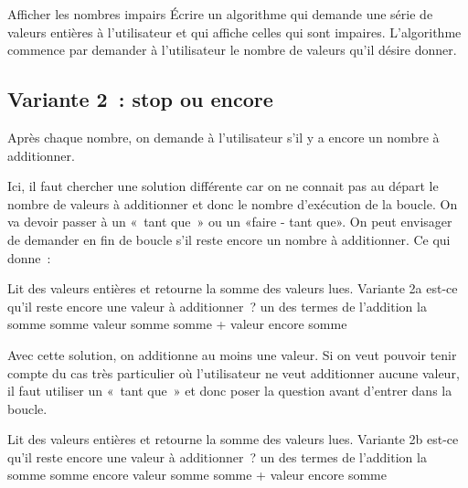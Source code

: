 		\begin{Exercice}{Afficher les nombres impairs}
			Écrire un algorithme qui demande une série
			de valeurs entières à l’utilisateur
			et qui affiche celles qui sont impaires.
			L’algorithme commence par demander à l’utilisateur
			le nombre de valeurs qu’il désire donner.
		\end{Exercice}
			
	\subsection{Variante 2~: stop ou encore}
	
		Après chaque nombre, 
		on demande à l’utilisateur s’il y a encore un nombre à additionner.

		Ici, il faut chercher une solution différente
		car on ne connait pas au départ le nombre de valeurs à additionner et
		donc le nombre d’exécution de la boucle. On va devoir passer à un
		«~tant que~» ou un «faire - tant que». On peut
		envisager de demander en fin de boucle s’il reste
		encore un nombre à additionner. Ce qui donne~:

		\begin{LDA}
		\LComment Lit des valeurs entières et retourne la somme des valeurs lues.
		 \RComment Variante 2a
			 \RComment est-ce qu’il reste encore une valeur à additionner~?
			 \RComment un des termes de l’addition
			 \RComment la somme
			\Let somme 
			\Repeat 
				\Read valeur
				\Let somme \Gets somme + valeur 
				\Read encore
			\Return somme
		\EndAlgo
		\end{LDA}
		
		Avec cette solution, on additionne au moins une valeur. 
		Si on veut pouvoir tenir compte du
		cas très particulier où l’utilisateur ne veut
		additionner aucune valeur, il faut utiliser un «~tant que~» et donc
		poser la question avant d’entrer dans la boucle.

		\begin{LDA}
		\LComment Lit des valeurs entières et retourne la somme des valeurs lues.
		 \RComment Variante 2b
			 \RComment est-ce qu’il reste encore une valeur à additionner~?
			 \RComment un des termes de l’addition
			 \RComment la somme
			\Let somme \Gets 0
			\Read encore
			\While{encore} 
				\Read valeur
				\Let somme \Gets somme + valeur 
				\Read encore
			\EndWhile
			\Return somme
		\EndAlgo
		\end{LDA}

